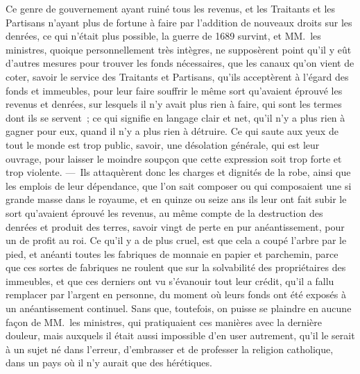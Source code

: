 \documentclass[french,twoside]{book} %
\begin{document}
Ce genre de gouvernement ayant ruiné tous les revenus, et les Traitants et les Partisans n’ayant plus de fortune à faire par l’addition de nouveaux droits sur les denrées, ce qui n’était plus possible, la guerre de 1689 survint, et MM. les ministres, quoique personnellement très intègres, ne supposèrent point qu’il y eût d’autres mesures pour trouver les fonds nécessaires, que les canaux qu’on vient de coter, savoir le service des Traitants et Partisans, qu’ils acceptèrent à l’égard des fonds et immeubles, pour leur faire souffrir le même sort qu’avaient éprouvé les revenus et denrées, sur lesquels il n’y avait plus rien à faire, qui sont les termes dont ils se servent ; ce qui signifie en langage clair et net, qu’il n’y a plus rien à gagner pour eux, quand il n’y a plus rien à détruire. Ce qui saute aux yeux de tout le monde est trop public, savoir, une désolation générale, qui est leur ouvrage, pour laisser le moindre soupçon que cette expression soit trop forte et trop violente. — Ils attaquèrent donc les charges et dignités de la robe, ainsi que les emplois de leur dépendance, que l’on sait composer ou qui composaient une si grande masse dans le royaume, et en quinze ou seize ans ils leur ont fait subir le sort qu’avaient éprouvé les revenus, au même compte de la destruction des denrées et produit des terres, savoir vingt de perte en pur anéantissement, pour un de profit au roi. Ce qu’il y a de plus cruel, est que cela a coupé l’arbre par le pied, et anéanti toutes les fabriques de monnaie en papier et parchemin, parce que ces sortes de fabriques ne roulent que sur la solvabilité des propriétaires des immeubles, et que ces derniers ont vu s’évanouir tout leur crédit, qu’il a fallu remplacer par l’argent en personne, du moment où leurs fonds ont été exposés à un anéantissement continuel. Sans que, toutefois, on puisse se plaindre en aucune façon de MM. les ministres, qui pratiquaient ces manières avec la dernière douleur, mais auxquels il était aussi impossible d’en user autrement, qu’il le serait à un sujet né dans l’erreur, d’embrasser et de professer la religion catholique, dans un pays où il n’y aurait que des hérétiques.\par
\end{document}
